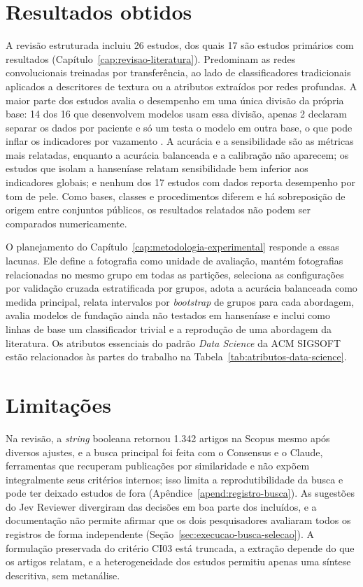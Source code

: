 \section{Resultados obtidos}
\label{sec:conclusoes}

A revisão estruturada incluiu 26 estudos, dos quais 17 são estudos
primários com resultados (Capítulo~\ref{cap:revisao-literatura}). Predominam
as redes convolucionais treinadas por transferência, ao lado de
classificadores tradicionais aplicados a descritores de textura ou a
atributos extraídos por redes profundas. A maior parte dos estudos avalia o
desempenho em uma única divisão da própria base: 14 dos 16 que desenvolvem
modelos usam essa divisão, apenas 2 declaram separar os dados por paciente e
só um testa o modelo em outra base, o que pode inflar os indicadores por
vazamento \cite{kapoor2023}. A acurácia e a sensibilidade são as métricas
mais relatadas, enquanto a acurácia balanceada e a calibração não aparecem;
os estudos que isolam a hanseníase relatam sensibilidade bem inferior aos
indicadores globais; e nenhum dos 17 estudos com dados reporta desempenho
por tom de pele. Como bases, classes e procedimentos diferem e há
sobreposição de origem entre conjuntos públicos, os resultados relatados não
podem ser comparados numericamente.

O planejamento do Capítulo~\ref{cap:metodologia-experimental} responde a
essas lacunas. Ele define a fotografia como unidade de avaliação, mantém
fotografias relacionadas no mesmo grupo em todas as partições, seleciona as
configurações por validação cruzada estratificada por grupos, adota a
acurácia balanceada como medida principal, relata intervalos por
\textit{bootstrap} de grupos para cada abordagem, avalia modelos de fundação
ainda não testados em hanseníase e inclui como linhas de base um
classificador trivial e a reprodução de uma abordagem da literatura. Os atributos essenciais do padrão \textit{Data Science} da ACM
SIGSOFT estão relacionados às partes do trabalho na
Tabela~\ref{tab:atributos-data-science}.

\section{Limitações}
\label{sec:limitacoes}

Na revisão, a \textit{string} booleana retornou 1.342 artigos na Scopus
mesmo após diversos ajustes, e a busca principal foi feita com o Consensus e
o Claude, ferramentas que recuperam publicações por similaridade e não
expõem integralmente seus critérios internos; isso limita a
reprodutibilidade da busca e pode ter deixado estudos de fora
(Apêndice~\ref{apend:registro-busca}). As sugestões do Jev Reviewer
divergiram das decisões em boa parte dos incluídos, e a documentação não
permite afirmar que os dois pesquisadores avaliaram todos os registros de
forma independente (Seção~\ref{sec:execucao-busca-selecao}). A formulação
preservada do critério CI03 está truncada, a extração depende do que os
artigos relatam, e a heterogeneidade dos estudos permitiu apenas uma síntese
descritiva, sem metanálise.

